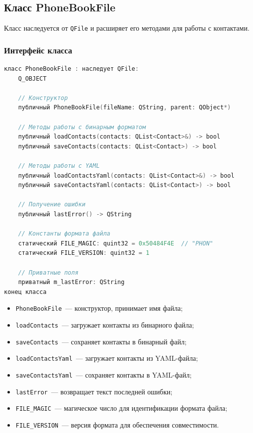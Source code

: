 \subsection{Класс PhoneBookFile}

Класс наследуется от \texttt{QFile} и расширяет его методами для работы с контактами.

\subsubsection*{Интерфейс класса}

\begin{lstlisting}[language=C, caption=Заголовочный файл phonebooktofile.h]
класс PhoneBookFile : наследует QFile:
    Q_OBJECT
    
    // Конструктор
    публичный PhoneBookFile(fileName: QString, parent: QObject*)

    // Методы работы с бинарным форматом
    публичный loadContacts(contacts: QList<Contact>&) -> bool
    публичный saveContacts(contacts: QList<Contact>) -> bool
    
    // Методы работы с YAML
    публичный loadContactsYaml(contacts: QList<Contact>&) -> bool
    публичный saveContactsYaml(contacts: QList<Contact>) -> bool
    
    // Получение ошибки
    публичный lastError() -> QString

    // Константы формата файла
    статический FILE_MAGIC: quint32 = 0x50484F4E  // "PHON"
    статический FILE_VERSION: quint32 = 1

    // Приватные поля
    приватный m_lastError: QString
конец класса
\end{lstlisting}

\begin{itemize}
    \item \texttt{PhoneBookFile}~--- конструктор, принимает имя файла;
    \item \texttt{loadContacts}~--- загружает контакты из бинарного файла;
    \item \texttt{saveContacts}~--- сохраняет контакты в бинарный файл;
    \item \texttt{loadContactsYaml}~--- загружает контакты из YAML-файла;
    \item \texttt{saveContactsYaml}~--- сохраняет контакты в YAML-файл;
    \item \texttt{lastError}~--- возвращает текст последней ошибки;
    \item \texttt{FILE\_MAGIC}~--- магическое число для идентификации формата файла;
    \item \texttt{FILE\_VERSION}~--- версия формата для обеспечения совместимости.
\end{itemize}

